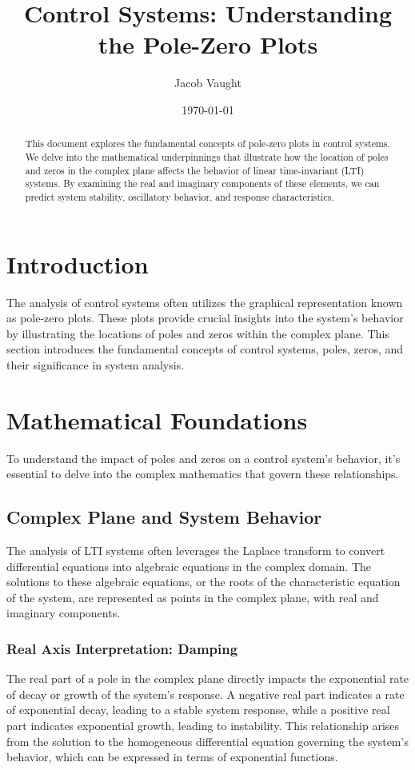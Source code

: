 \documentclass[12pt]{article}
\title{Control Systems: Understanding the Pole-Zero Plots}
\author{Jacob Vaught}
\date{\today}
\begin{document}
\maketitle

\begin{abstract}
This document explores the fundamental concepts of pole-zero plots in control systems. We delve into the mathematical underpinnings that illustrate how the location of poles and zeros in the complex plane affects the behavior of linear time-invariant (LTI) systems. By examining the real and imaginary components of these elements, we can predict system stability, oscillatory behavior, and response characteristics.
\end{abstract}

\tableofcontents

\newpage

\section{Introduction}
The analysis of control systems often utilizes the graphical representation known as pole-zero plots. These plots provide crucial insights into the system's behavior by illustrating the locations of poles and zeros within the complex plane. This section introduces the fundamental concepts of control systems, poles, zeros, and their significance in system analysis.

\section{Mathematical Foundations}
To understand the impact of poles and zeros on a control system's behavior, it's essential to delve into the complex mathematics that govern these relationships.

\subsection{Complex Plane and System Behavior}
The analysis of LTI systems often leverages the Laplace transform to convert differential equations into algebraic equations in the complex domain. The solutions to these algebraic equations, or the roots of the characteristic equation of the system, are represented as points in the complex plane, with real and imaginary components.

\subsubsection{Real Axis Interpretation: Damping}
The real part of a pole in the complex plane directly impacts the exponential rate of decay or growth of the system's response. A negative real part indicates a rate of exponential decay, leading to a stable system response, while a positive real part indicates exponential growth, leading to instability. This relationship arises from the solution to the homogeneous differential equation governing the system's behavior, which can be expressed in terms of exponential functions.
\end{document}
